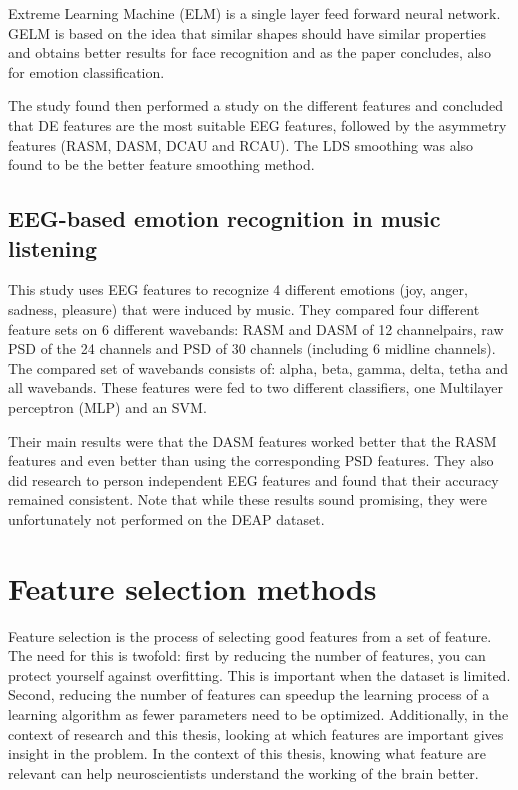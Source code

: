 Extreme Learning Machine (ELM)  is a single layer feed forward neural network\citep{ELMpaper}. GELM is based on the idea that similar shapes should have similar properties and obtains better results for face recognition\citep{GELMpaper} and as the paper concludes, also for emotion classification.

\npar

The study found then performed a study on the different features and concluded that DE features are the most suitable EEG features, followed by the asymmetry features (RASM, DASM, DCAU and RCAU). The LDS smoothing was also found to be the better feature smoothing method. 

\subsection{EEG-based emotion recognition in music listening}
This study uses EEG features to recognize 4 different emotions (joy, anger, sadness, pleasure) that were induced by music. They compared four different feature sets on 6 different wavebands: RASM and DASM of 12 channelpairs, raw PSD of the 24 channels and PSD of 30 channels (including 6 midline channels). The compared set of wavebands consists of: alpha, beta, gamma, delta, tetha and all wavebands. These features were fed to two different classifiers, one Multilayer perceptron (MLP)  and an SVM. 

\npar

Their main results were that the DASM features worked better that the RASM features and even better than using the corresponding PSD features. They also did research to person independent EEG features and found that their accuracy remained consistent. Note that while these results sound promising, they were unfortunately not performed on the DEAP dataset.  

\section{Feature selection methods}
Feature selection is the process of selecting good features from a set of feature. The need for this is twofold: first by reducing the number of features, you can protect yourself against overfitting. This is important when the dataset is limited. Second, reducing the number of features can speedup the learning process of a learning algorithm as fewer parameters need to be optimized. Additionally, in the context of research and this thesis, looking at which features are important gives insight in the problem. In the context of this thesis, knowing what feature are relevant can help neuroscientists understand the working of the brain better.

